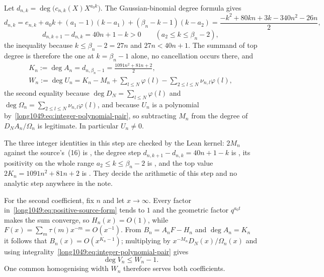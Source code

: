 \documentclass[11pt]{article}
\begin{document}
Let $d_{n,k}=\deg\bigl(c_{n,k}(X)X^{a_0k}\bigr)$.  The Gaussian-binomial degree
formula gives
\[
 d_{n,k}=e_{n,k}+a_0k+(a_1-1)(k-a_1)+(\beta_n-k-1)(k-a_2)
 =\frac{-k^{2}+80kn+3k-340n^{2}-26n}{2},
\]
\[
 d_{n,k+1}-d_{n,k}=40n+1-k>0\qquad(a_2\le k\le\beta_n-2),
\]
the inequality because $k\le\beta_n-2=27n$ and $27n<40n+1$.  The summand of
top degree is therefore the one at $k=\beta_n-1$ alone, no cancellation occurs
there, and
\begin{equation}\label{long1049:eq:exact-degree}
 \begin{gathered}
 K_n:=\deg A_n=d_{n,\beta_n-1}=\frac{1091n^{2}+81n+2}{2},
 \\
 W_n:=\deg U_n=K_n-M_n+\sum_{l\le N}\varphi(l)-\sum_{2\le l\le N}\nu_{n,l}\varphi(l),
\end{gathered}
\end{equation}
the second equality because $\deg D_N=\sum_{l\le N}\varphi(l)$ and
$\deg\Omega_n=\sum_{2\le l\le N}\nu_{n,l}\varphi(l)$, and because
$U_n$ is a polynomial by~\eqref{long1049:eq:integer-polynomial-pair}, so subtracting
$M_n$ from the degree of $D_NA_n/\Omega_n$ is legitimate.  In particular
$U_n\ne0$.

The three integer identities in this step are checked by the Lean kernel:
$2M_n$ against the source's~(16) is
, the degree step $d_{n,k+1}-d_{n,k}=40n+1-k$ is
, its positivity on the whole range $a_2\le k\le\beta_n-2$ is
, and the top value $2K_n=1091n^{2}+81n+2$ is
.  They decide the arithmetic of this step and no analytic step
anywhere in the note.

For the second coefficient, fix $n$ and let $x\to\infty$.  Every factor
in~\eqref{long1049:eq:positive-source-form} tends to $1$ and the geometric factor
$q^{a_0t}$ makes the sum converge, so $H_n(x)=O(1)$, while
$F(x)=\sum_m\tau(m)x^{-m}=O(x^{-1})$.  From $B_n=A_nF-H_n$ and
$\deg A_n=K_n$ it follows that $B_n(x)=O(x^{K_n-1})$; multiplying by
$x^{-M_n}D_N(x)/\Omega_n(x)$ and using
integrality~\eqref{long1049:eq:integer-polynomial-pair} gives
\begin{equation}\label{long1049:eq:V-degree}
 \deg V_n\le W_n-1 .
\end{equation}
One common homogenising width $W_n$ therefore serves both coefficients.
\end{document}
